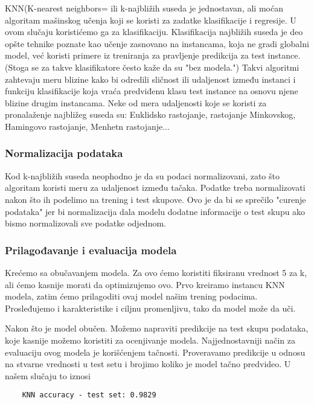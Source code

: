 \documentclass[a4paper,12pt]{article}
\begin{document}
KNN(K-nearest neighbors= ili k-najbližih suseda je jednostavan, ali moćan algoritam mašinskog učenja koji se koristi za zadatke klasifikacije i regresije. U ovom slučaju koristićemo ga za klasifikaciju. Klasifikacija najbližih suseda je deo opšte tehnike poznate kao učenje zasnovano na instancama, koja ne gradi globalni model, već koristi primere iz treniranja za pravljenje predikcija za test instance. (Stoga se za takve klasifikatore često kaže da su "bez modela.") Takvi algoritmi zahtevaju meru blizine kako bi odredili sličnost ili udaljenost između instanci i funkciju klasifikacije koja vraća predviđenu klasu test instance na osnovu njene blizine drugim instancama. Neke od mera udaljenosti koje se koristi za pronalaženje najbližeg suseda su: Euklidsko rastojanje, rastojanje Minkovskog, Hamingovo rastojanje, Menhetn rastojanje...

\subsubsection{Normalizacija podataka}
Kod k-najbližih suseda neophodno je da su podaci normalizovani, zato što algoritam koristi meru za udaljenost između tačaka.
Podatke treba normalizovati nakon što ih podelimo na trening i test skupove. Ovo je da bi se sprečilo "curenje podataka" jer bi normalizacija dala modelu dodatne informacije o test skupu ako bismo normalizovali sve podatke odjednom.

\subsubsection{Prilagođavanje i evaluacija modela}
Krećemo sa obučavanjem modela. Za ovo ćemo koristiti fiksiranu vrednost 5 za k, ali ćemo kasnije morati da optimizujemo ovo. Prvo kreiramo instancu KNN modela, zatim ćemo prilagoditi ovaj model našim trening podacima. Prosleđujemo i karakteristike i ciljnu promenljivu, tako da model može da uči.

Nakon što je model obučen. Možemo napraviti predikcije na test skupu podataka, koje kasnije možemo koristiti za ocenjivanje modela.
Najjednostavniji način za evaluaciju ovog modela je korišćenjem tačnosti. Proveravamo predikcije u odnosu na stvarne vrednosti u test setu i brojimo koliko je model tačno predvideo.
U našem slučaju to iznosi

\begin{verbatim}
    KNN accuracy - test set: 0.9829
\end{verbatim}
\end{document}
